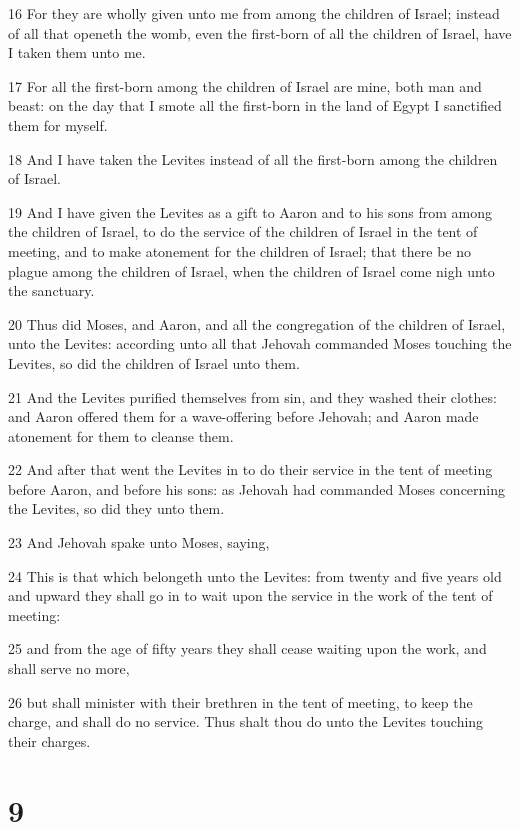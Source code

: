 \par 16 For they are wholly given unto me from among the children of Israel; instead of all that openeth the womb, even the first-born of all the children of Israel, have I taken them unto me.
\par 17 For all the first-born among the children of Israel are mine, both man and beast: on the day that I smote all the first-born in the land of Egypt I sanctified them for myself.
\par 18 And I have taken the Levites instead of all the first-born among the children of Israel.
\par 19 And I have given the Levites as a gift to Aaron and to his sons from among the children of Israel, to do the service of the children of Israel in the tent of meeting, and to make atonement for the children of Israel; that there be no plague among the children of Israel, when the children of Israel come nigh unto the sanctuary.
\par 20 Thus did Moses, and Aaron, and all the congregation of the children of Israel, unto the Levites: according unto all that Jehovah commanded Moses touching the Levites, so did the children of Israel unto them.
\par 21 And the Levites purified themselves from sin, and they washed their clothes: and Aaron offered them for a wave-offering before Jehovah; and Aaron made atonement for them to cleanse them.
\par 22 And after that went the Levites in to do their service in the tent of meeting before Aaron, and before his sons: as Jehovah had commanded Moses concerning the Levites, so did they unto them.
\par 23 And Jehovah spake unto Moses, saying,
\par 24 This is that which belongeth unto the Levites: from twenty and five years old and upward they shall go in to wait upon the service in the work of the tent of meeting:
\par 25 and from the age of fifty years they shall cease waiting upon the work, and shall serve no more,
\par 26 but shall minister with their brethren in the tent of meeting, to keep the charge, and shall do no service. Thus shalt thou do unto the Levites touching their charges.

\chapter{9}

